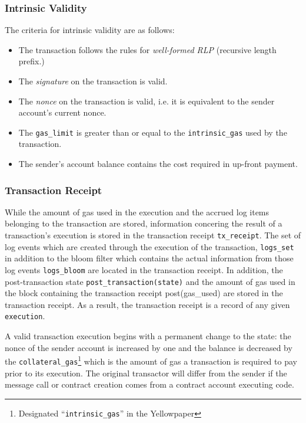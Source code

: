 \documentclass[10pt,letterpaper,leqno,bibliography=totoc]{scrartcl}
\newenvironment{alphafootnotes}
{\par\edef\savedfootnotenumber{\number\value{footnote}}
\renewcommand{\thefootnote}{\alph{footnote}}
\setcounter{footnote}{0}}
{\par\setcounter{footnote}{\savedfootnotenumber}}
\begin{document}
\begin{alphafootnotes}
\begin{multicols*}{2}
			\subsubsection{Intrinsic Validity}
				The criteria for intrinsic validity are as follows:
				\begin{itemize}
				\item The transaction follows the rules for \textsl{well-formed RLP} (recursive length prefix.)
				\item The \textsl{signature} on the transaction is valid.
				\item The \textsl{nonce} on the transaction is valid, i.e. it is equivalent to the sender account's current nonce.
				\item The \texttt{gas\_limit} is greater than or equal to the \texttt{intrinsic\_gas} used by the transaction.
				\item The sender's account balance contains the cost required in up-front payment.
				\end{itemize}

			\subsubsection{Transaction Receipt}
				While the amount of gas used in the execution and the accrued log items belonging to the transaction are stored, information concering the result of a transaction's execution is stored in the transaction receipt \texttt{tx\_receipt}. The set of log events which are created through the execution of the transaction, \texttt{logs\_set} in addition to the bloom filter which contains the actual information from those log events \texttt{logs\_bloom} are located in the transaction receipt. In addition, the post-transaction state \texttt{post\_transaction(state)} and the amount of gas used in the block containing the transaction receipt post(gas\_used) are stored in the transaction receipt. As a result, the transaction receipt is a record of any given \texttt{execution}.
					
					A valid transaction execution begins with a permanent change to the state: the nonce of the sender account is increased by one and the balance is decreased by the \texttt{collateral\_gas}\footnote{Designated ``\texttt{intrinsic\_gas}'' in the Yellowpaper} which is the amount of gas a transaction is required to pay prior to its execution. The original transactor will differ from the sender if the message call or contract creation comes from a contract account executing code. 
			

\end{multicols*}
\end{alphafootnotes}
\end{document}
